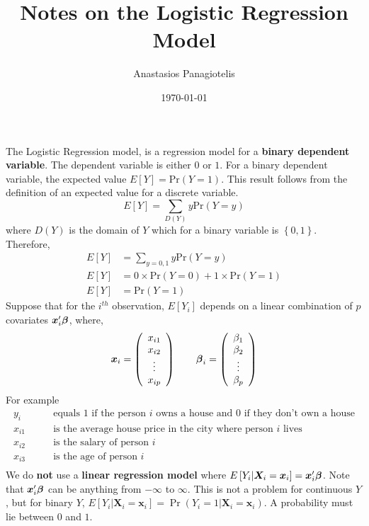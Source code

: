 \documentclass{article}
\author{Anastasios Panagiotelis}
\title{Notes on the Logistic Regression Model}
\date{\today}
\newcommand{\bbeta}{\mbox{\boldmath $\beta$}}
\begin{document}
\maketitle
The Logistic Regression model, is a regression model for a {\bf binary dependent variable}.  The dependent variable is either $0$ or $1$.  For a binary dependent variable, the expected value $E[Y]=\mbox{Pr}(Y=1)$.  This result follows from the definition of an expected value for a discrete variable.
\begin{equation}
E[Y]=\sum_{D(Y)}y\mbox{Pr}(Y=y)
\end{equation}
where $D(Y)$ is the domain of $Y$ which for a binary variable is $\left\{0,1\right\}$.  Therefore,
\begin{align}
E[Y]&=\sum_{y=0,1}y\mbox{Pr}(Y=y)\\
E[Y]&=0\times\mbox{Pr}(Y=0)+1\times\mbox{Pr}(Y=1)\\
E[Y]&=\mbox{Pr}(Y=1)
\end{align}
Suppose that for the $i^{th}$ observation, $E\left[Y_i\right]$ depends on a linear combination of $p$ covariates ${\bm x}_i'\bbeta$, where,
\begin{equation}
{\bm x}_i=\left(
\begin{array}{c}
x_{i1}\\
x_{i2}\\
\vdots\\
x_{ip}
\end{array}
\right)
\quad\quad
{\bbeta}_i=\left(
\begin{array}{c}
\beta_{1}\\
\beta_{2}\\
\vdots\\
\beta_{p}
\end{array}
\right)
\end{equation}
For example
\begin{align*}
y_i& \quad\quad\mbox{equals 1 if the person $i$ owns a house and 0 if they don't own a house}\\
x_{i1}& \quad\quad\mbox{is the average house price in the city where person $i$ lives}\\
x_{i2}& \quad\quad\mbox{is the salary of person $i$}\\
x_{i3}& \quad\quad\mbox{is the age of person $i$}\\
\end{align*}   
We do {\bf not} use a {\bf linear regression model} where $E\left[Y_i|{\bm X_i}={\bm x_i}\right]={\bm x}_i'\bbeta$.  Note that ${\bm x}_i'\bbeta$ can be anything from $-\infty$ to $\infty$. This is not a problem for continuous $Y$, but for binary $Y$, $E\left[Y_i|{\bm X_i}={\bm x_i}\right]=\Pr(Y_i=1|{\bm X_i}={\bm x_i})$. A probability must lie between $0$ and $1$.
\end{document}
